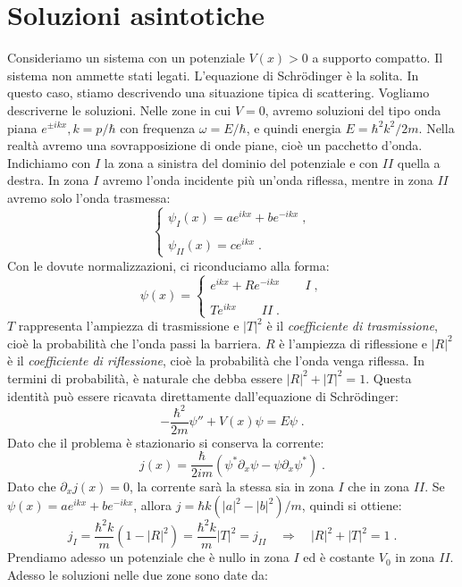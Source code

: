 \documentclass[12pt,a4paper]{report}
\theoremstyle{definition}
\numberwithin{equation}{section}
\newcommand{\Sch}{Schrödinger}
\begin{document}
\section{Soluzioni asintotiche}
Consideriamo un sistema con un potenziale $V(x)>0$ a supporto compatto. Il sistema non ammette stati legati. L'equazione di \Sch\; è la solita. In questo caso, stiamo descrivendo una situazione tipica di scattering. Vogliamo descriverne le soluzioni. Nelle zone in cui $V=0$, avremo soluzioni del tipo onda piana $e^{\pm ikx}, k=p/\hbar$ con frequenza $\omega=E/\hbar$, e quindi energia $E=\hbar^2k^2/2m$. Nella realtà avremo una sovrapposizione di onde piane, cioè un pacchetto d'onda. Indichiamo con $I$ la zona a sinistra del dominio del potenziale e con $II$ quella a destra. In zona $I$ avremo l'onda incidente più un'onda riflessa, mentre in zona $II$ avremo solo l'onda trasmessa:
\begin{equation*}
\begin{cases}
\psi_I(x)= ae^{ikx}+be^{-ikx}\;, \\
\\
\psi_{II}(x)=ce^{ikx}\;.
\end{cases}
\end{equation*}
Con le dovute normalizzazioni, ci riconduciamo alla forma:
\begin{equation}
\psi(x)=\begin{cases}
e^{ikx}+Re^{-ikx} \qquad I\;, \\
\\
Te^{ikx} \qquad II\;.
\end{cases}
\end{equation}
$T$ rappresenta l'ampiezza di trasmissione e $|T|^2$ è il \textit{coefficiente di trasmissione}, cioè la probabilità che l'onda passi la barriera. $R$ è l'ampiezza di riflessione e $|R|^2$ è il \textit{coefficiente di riflessione}, cioè la probabilità che l'onda venga riflessa. In termini di probabilità, è naturale che debba essere $|R|^2+|T|^2=1$. Questa identità può essere ricavata direttamente dall'equazione di \Sch:
$$
-\frac{\hbar^2}{2m}\psi''+V(x)\psi=E\psi\;.
$$
Dato che il problema è stazionario si conserva la corrente:
$$
j(x)=\frac{\hbar}{2im}(\psi^*\partial_x\psi-\psi\partial_x\psi^*)\;.
$$
Dato che $\partial_xj(x)=0$, la corrente sarà la stessa sia in zona $I$ che in zona $II$. Se $\psi(x)=ae^{ikx}+be^{-ikx}$, allora $j=\hbar k(|a|^2-|b|^2)/m$, quindi si ottiene:
$$
j_I=\frac{\hbar^2k}{m}(1-|R|^2)=\frac{\hbar^2 k}{m}|T|^2=j_{II} \quad \Longrightarrow \quad |R|^2+|T|^2=1\;.
$$
Prendiamo adesso un potenziale che è nullo in zona $I$ ed è costante $V_0$ in zona $II$. Adesso le soluzioni nelle due zone sono date da:
\end{document}
